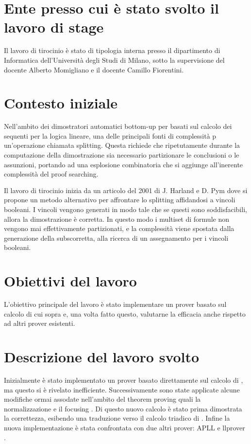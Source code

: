 \documentclass[a4paper, 12pt, italian]{article}
\begin{document}
\section{Ente presso cui è stato svolto il lavoro di stage}
Il lavoro di tirocinio è stato di tipologia interna presso il dipartimento di Informatica dell'Università degli Studi di Milano, sotto la supervisione del docente Alberto Momigliano e il docente Camillo Fiorentini.

\section{Contesto iniziale}
Nell'ambito dei dimostratori automatici bottom-up per basati sul calcolo dei sequenti per la logica lineare, una delle principali fonti di complessità p un'operazione chiamata splitting.
Questa richiede che ripetutamente durante la computazione della dimostrazione sia necessario partizionare le conclusioni o le assunzioni, portando ad una esplosione combinatoria che si aggiunge all'inerente complessità del proof searching.

Il lavoro di tirocinio inizia da un articolo del 2001 di J. Harland e D. Pym \cite{HarlandPym} dove si propone un metodo alternativo per affrontare lo splitting affidandosi a vincoli booleani.
I vincoli vengono generati in modo tale che se questi sono soddisfacibili, allora la dimostrazione è corretta. 
In questo modo i multiset di formule non vengono mai effettivamente partizionati, e la complessità viene spostata dalla generazione della subscorretta, alla ricerca di un assegnamento per i vincoli booleani.

\section{Obiettivi del lavoro}
L'obiettivo principale del lavoro è stato implementare un prover basato sul calcolo di cui sopra e, una volta fatto questo, valutarne la efficacia anche rispetto ad altri prover esistenti.

\section{Descrizione del lavoro svolto}
Inizialmente è stato implementato un prover basato direttamente sul calcolo di \cite{HarlandPym}, ma questo si è rivelato inefficiente.
Successivamente sono state applicate alcune modifiche ormai assodate nell'ambito del theorem proving quali la normalizzazione e il focusing \cite{Focusing}.
Di questo nuovo calcolo è stato prima dimostrata la correttezza, esibendo una traduzione verso il calcolo triadico di \cite{Focusing}.
Infine la nuova implementazione è stata confrontata con due altri prover: APLL \cite{APLL} e llprover \cite{llprover}.
\end{document}
